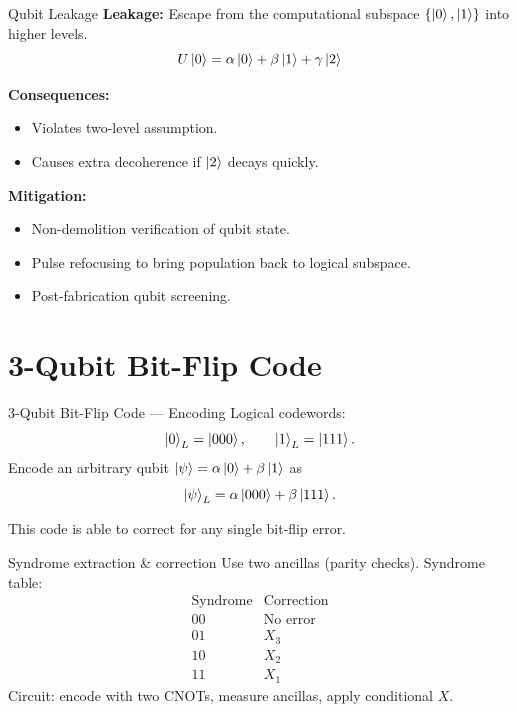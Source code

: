 \documentclass[10pt]{beamer}
\begin{document}
\begin{frame}{Qubit Leakage}
\textbf{Leakage:} Escape from the computational subspace $\{\ket{0}, \ket{1}\}$ into higher levels.
\[
U\ket{0} = \alpha\ket{0} + \beta\ket{1} + \gamma\ket{2}
\]

\textbf{Consequences:}
\begin{itemize}
    \item Violates two-level assumption.
    \item Causes extra decoherence if $\ket{2}$ decays quickly.
\end{itemize}

\textbf{Mitigation:}
\begin{itemize}
    \item Non-demolition verification of qubit state.
    \item Pulse refocusing to bring population back to logical subspace.
    \item Post-fabrication qubit screening.
\end{itemize}
\end{frame}

\section{3-Qubit Bit-Flip Code}
\begin{frame}{3-Qubit Bit-Flip Code — Encoding}
  Logical codewords:
  \[
    \ket{0}_L=\ket{000},\qquad \ket{1}_L=\ket{111}.
  \]
  Encode an arbitrary qubit \(\ket{\psi}=\alpha\ket{0}+\beta\ket{1}\) as
  \[
    \ket{\psi}_L=\alpha\ket{000}+\beta\ket{111}.
  \]
 
  This code is able to correct for any single bit-flip error.
\end{frame}

\begin{frame}{Syndrome extraction \& correction}
  Use two ancillas (parity checks). Syndrome table:
  \[
    \begin{array}{c|c}
      \text{Syndrome} & \text{Correction} \\ \hline
      00 & \text{No error} \\
      01 & X_3 \\
      10 & X_2 \\
      11 & X_1
    \end{array}
  \]
  Circuit: encode with two CNOTs, measure ancillas, apply conditional \(X\).
\end{frame}
\end{document}
